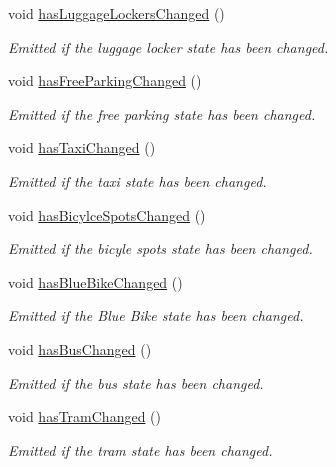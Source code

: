 \begin{DoxyCompactItemize}
void \mbox{\hyperlink{classQRail_1_1StationEngine_1_1Station_a707ec4770588c1bb293675b2766acf19}{has\+Luggage\+Lockers\+Changed}} ()
\begin{DoxyCompactList}\small\item\em Emitted if the luggage locker state has been changed. \end{DoxyCompactList}\item 
void \mbox{\hyperlink{classQRail_1_1StationEngine_1_1Station_a503389bd75e4c98bc66e1c2e803c57c9}{has\+Free\+Parking\+Changed}} ()
\begin{DoxyCompactList}\small\item\em Emitted if the free parking state has been changed. \end{DoxyCompactList}\item 
void \mbox{\hyperlink{classQRail_1_1StationEngine_1_1Station_afb126c23f98971633f13fcf45ed400fe}{has\+Taxi\+Changed}} ()
\begin{DoxyCompactList}\small\item\em Emitted if the taxi state has been changed. \end{DoxyCompactList}\item 
void \mbox{\hyperlink{classQRail_1_1StationEngine_1_1Station_af8ad525183b3f1becbbd4856ca3fd5a2}{has\+Bicylce\+Spots\+Changed}} ()
\begin{DoxyCompactList}\small\item\em Emitted if the bicyle spots state has been changed. \end{DoxyCompactList}\item 
void \mbox{\hyperlink{classQRail_1_1StationEngine_1_1Station_a29b9d2793153da2639a8b50ea0860636}{has\+Blue\+Bike\+Changed}} ()
\begin{DoxyCompactList}\small\item\em Emitted if the Blue Bike state has been changed. \end{DoxyCompactList}\item 
void \mbox{\hyperlink{classQRail_1_1StationEngine_1_1Station_a36cd28ed4095e97704882db3000d7dbb}{has\+Bus\+Changed}} ()
\begin{DoxyCompactList}\small\item\em Emitted if the bus state has been changed. \end{DoxyCompactList}\item 
void \mbox{\hyperlink{classQRail_1_1StationEngine_1_1Station_a1e0a91d242d837ac6b87460147cc420f}{has\+Tram\+Changed}} ()
\begin{DoxyCompactList}\small\item\em Emitted if the tram state has been changed. \end{DoxyCompactList}\item 

\end{DoxyCompactItemize}
